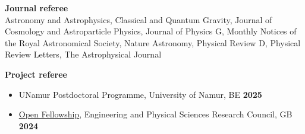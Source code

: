 \textbf{Journal referee}
%
\vspace*{0.05in} \\
\hspace*{1em}
Astronomy and Astrophysics,
Classical and Quantum Gravity,
Journal of Cosmology and Astroparticle Physics,
Journal of Physics G,
Monthly Notices of the Royal Astronomical Society,
Nature Astronomy,
Physical Review D,
Physical Review Letters,
The Astrophysical Journal

\textbf{Project referee}
%
\vspace*{0.05in}
\begin{itemize}
    \item[] UNamur Postdoctoral Programme, University of Namur, BE
    \hfill \textbf{2025}
    \item[]
    \href{https://www.ukri.org/opportunity/epsrc-responsive-mode-open-fellowship/}
    {Open Fellowship},
    Engineering and Physical Sciences Research Council, GB \hfill \textbf{2024}
\end{itemize}

